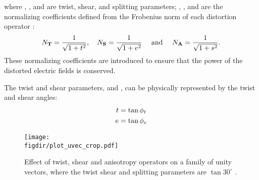 		where \twistp, {\shearp}, and {\splittingp} are twist, shear, and splitting parameters; {\NT}, {\NS}, and {\NA} are the normalizing coefficients defined from the Frobenius norm of each distortion operator \citep[also see][]{bibby2005a}:
		\begin{equation}
				N_{\mathbf{T}} = \frac{1}{\sqrt{1+t^2}}, \quad
				N_{\mathbf{S}} = \frac{1}{\sqrt{1+e^2}}\quad \text{ and } \quad
				N_{\mathbf{A}} = \frac{1}{\sqrt{1+s^2}}. 
		\end{equation}
		These normalizing coefficients are introduced to ensure that the power of the distorted electric fields is conserved.  
		
		The twist and shear parameters, {\twistp} and {\shearp}, can be physically represented by the twist and shear angles:
		\begin{equation}
			\begin{split}
				t & = \tan \phi_t \\
				e & = \tan \phi_e 
			\end{split}
		\end{equation}

\begin{figure}[!h]
	\centering
	\texttt{[image: \\figdir/plot\_uvec\_crop.pdf]}
	\caption[Effect of twist, shear and anisotropy operators on a family of unity vectors]{Effect of twist, shear and anisotropy operators on a family of unity vectors, where the twist shear and splitting parameters are $\tan 30^\circ$ \citep[after][]{groom1989a}.}
	\label{fig:gtes_vector}
\end{figure}
		
